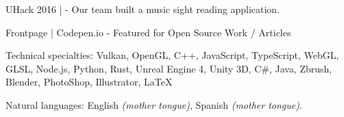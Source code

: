 \documentclass[10pt,a4paper]{article}
\begin{document}
\inlineheadsection %
{UHack 2016 | }
{ - Our team built a music sight reading application.}

\inlineheadsection %
{Frontpage  | Codepen.io}
{ - Featured for Open Source Work / Articles}


\spacedhrule{1.6em}{-0.4em} %



\inlineheadsection %
{Technical specialties:}
{Vulkan, OpenGL, C++, JavaScript, TypeScript, WebGL, GLSL, Node.js, Python, Rust, Unreal Engine 4, Unity 3D, C\#, Java, Zbrush, Blender, PhotoShop, Illustrator, LaTeX}


\inlineheadsection %
{Natural languages:}
{English \textit{(mother tongue)}, Spanish \textit{(mother tongue)}.}


\spacedhrule{1.6em}{-0.4em} %
\end{document}
